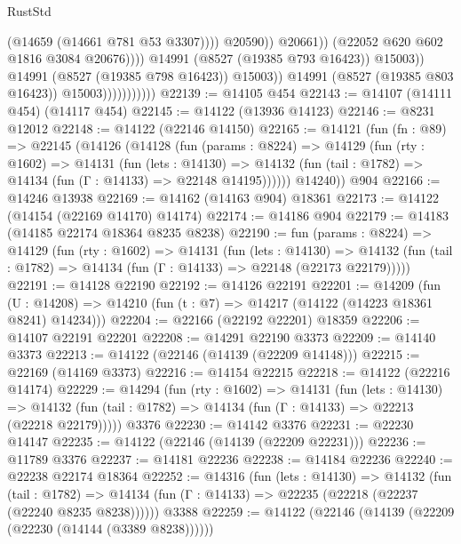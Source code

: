 \begin{lexlean}{RustStd}
\begin{coremodule}
                                                    (@14659 (@14661 @781 @53 @3307))))
                                                @20590))
                                            @20661))
                                        (@22052 @620 @602 @1816 @3084 @20676))))
                                  @14991
                                  (@8527 (@19385 @793 @16423))
                                  @15003))
                              @14991
                              (@8527 (@19385 @798 @16423))
                              @15003))
                          @14991
                          (@8527 (@19385 @803 @16423))
                          @15003)))))))))))
@22139 := @14105 @454
@22143 := @14107 (@14111 @454) (@14117 @454)
@22145 := @14122 (@13936 @14123)
@22146 := @8231 @12012
@22148 := @14122 (@22146 @14150)
@22165 := @14121
    (fun (fn : @89) =>
    @22145
      (@14126
        (@14128
          (fun (params : @8224) =>
          @14129
            (fun (rty : @1602) =>
            @14131
              (fun (lets : @14130) =>
              @14132 (fun (tail : @1782) => @14134 (fun (Γ : @14133) => @22148 @14195))))))
        @14240))
    @904
@22166 := @14246 @13938
@22169 := @14162 (@14163 @904) @18361
@22173 := @14122 (@14154 (@22169 @14170) @14174)
@22174 := @14186 @904
@22179 := @14183 (@14185 @22174 @18364 @8235 @8238)
@22190 := fun (params : @8224) =>
  @14129
    (fun (rty : @1602) =>
    @14131
      (fun (lets : @14130) =>
      @14132 (fun (tail : @1782) => @14134 (fun (Γ : @14133) => @22148 (@22173 @22179)))))
@22191 := @14128 @22190
@22192 := @14126 @22191
@22201 := @14209
    (fun (U : @14208) => @14210 (fun (t : @7) => @14217 (@14122 (@14223 @18361 @8241) @14234)))
@22204 := @22166 (@22192 @22201) @18359
@22206 := @14107 @22191 @22201
@22208 := @14291 @22190 @3373
@22209 := @14140 @3373
@22213 := @14122 (@22146 (@14139 (@22209 @14148)))
@22215 := @22169 (@14169 @3373)
@22216 := @14154 @22215
@22218 := @14122 (@22216 @14174)
@22229 := @14294
    (fun (rty : @1602) =>
    @14131
      (fun (lets : @14130) =>
      @14132 (fun (tail : @1782) => @14134 (fun (Γ : @14133) => @22213 (@22218 @22179)))))
    @3376
@22230 := @14142 @3376
@22231 := @22230 @14147
@22235 := @14122 (@22146 (@14139 (@22209 @22231)))
@22236 := @11789 @3376
@22237 := @14181 @22236
@22238 := @14184 @22236
@22240 := @22238 @22174 @18364
@22252 := @14316
    (fun (lets : @14130) =>
    @14132
      (fun (tail : @1782) =>
      @14134 (fun (Γ : @14133) => @22235 (@22218 (@22237 (@22240 @8235 @8238))))))
    @3388
@22259 := @14122 (@22146 (@14139 (@22209 (@22230 (@14144 (@3389 @8238))))))

\end{coremodule}
\end{lexlean}
